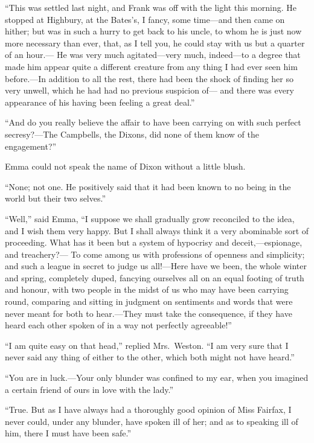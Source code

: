 ``This was settled last night, and Frank was off with the light
this morning.  He stopped at Highbury, at the Bates's, I fancy,
some time---and then came on hither; but was in such a hurry to get
back to his uncle, to whom he is just now more necessary than ever,
that, as I tell you, he could stay with us but a quarter of an hour.---%
He was very much agitated---very much, indeed---to a degree that made
him appear quite a different creature from any thing I had ever seen
him before.---In addition to all the rest, there had been the shock of
finding her so very unwell, which he had had no previous suspicion of---%
and there was every appearance of his having been feeling a great deal.''

``And do you really believe the affair to have been carrying on
with such perfect secresy?---The Campbells, the Dixons, did none
of them know of the engagement?''

Emma could not speak the name of Dixon without a little blush.

``None; not one.  He positively said that it had been known to no
being in the world but their two selves.''

``Well,'' said Emma, ``I suppose we shall gradually grow reconciled
to the idea, and I wish them very happy.  But I shall always
think it a very abominable sort of proceeding.  What has it been
but a system of hypocrisy and deceit,---espionage, and treachery?---%
To come among us with professions of openness and simplicity;
and such a league in secret to judge us all!---Here have we been,
the whole winter and spring, completely duped, fancying ourselves
all on an equal footing of truth and honour, with two people in the
midst of us who may have been carrying round, comparing and sitting
in judgment on sentiments and words that were never meant for both
to hear.---They must take the consequence, if they have heard each
other spoken of in a way not perfectly agreeable!''

``I am quite easy on that head,'' replied Mrs.\ Weston.  ``I am
very sure that I never said any thing of either to the other,
which both might not have heard.''

``You are in luck.---Your only blunder was confined to my ear,
when you imagined a certain friend of ours in love with the lady.''

``True.  But as I have always had a thoroughly good opinion of Miss
Fairfax, I never could, under any blunder, have spoken ill of her;
and as to speaking ill of him, there I must have been safe.''

